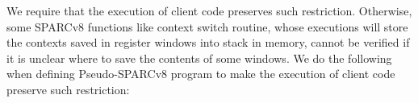 We require that the execution of client code
preserves such restriction. Otherwise, some SPARCv8
functions like context switch routine, whose
executions will store the contexts saved in
register windows into stack in memory, cannot be
verified if it is unclear where to save the
contents of some windows.
We do the following when defining
Pseudo-SPARCv8 program to make the execution
of client code preserve such restriction:

